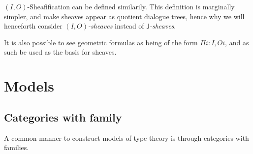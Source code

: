 \documentclass[11pt]{article}
\newcommand{\0}{\mathbf{0}}
\newcommand{\1}{\mathbf{1}}
\begin{document}
$(I,O)$-Sheafification can be defined similarily. This definition is marginally simpler, and make sheaves appear as quotient dialogue trees, hence why we will henceforth consider \emph{$(I,O)$-sheaves} instead of \emph{$\mathsf{J}$-sheaves}.

It is also possible to see geometric formulas as being of the form $\Pi i : I, O i$, and as such be used as the basis for sheaves.

\section{Models}\label{Models}

\subsection{Categories with family}

A common manner to construct models of type theory is through categories with families.
\end{document}
